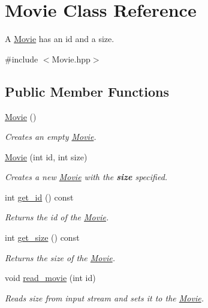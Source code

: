 \hypertarget{class_movie}{\section{Movie Class Reference}
\label{de/d14/class_movie}
}


A \hyperlink{class_movie}{Movie} has an id and a size.  




{\ttfamily \#include $<$Movie.\-hpp$>$}

\subsection*{Public Member Functions}
\begin{DoxyCompactItemize}
\item 
\hyperlink{class_movie_a62d82e9e61d6349ae66a73d0af6667ac}{Movie} ()
\begin{DoxyCompactList}\small\item\em Creates an empty \hyperlink{class_movie}{Movie}. \end{DoxyCompactList}\item 
\hyperlink{class_movie_a914e028c5499c5945f3acfb785977802}{Movie} (int id, int size)
\begin{DoxyCompactList}\small\item\em Creates a new \hyperlink{class_movie}{Movie} with the {\bfseries size} specified. \end{DoxyCompactList}\item 
int \hyperlink{class_movie_a363e66932a5d16dc86c58f57a8b3e72a}{get\-\_\-id} () const 
\begin{DoxyCompactList}\small\item\em Returns the id of the \hyperlink{class_movie}{Movie}. \end{DoxyCompactList}\item 
int \hyperlink{class_movie_a92d213d1f005f758cd298dff2a0355f8}{get\-\_\-size} () const 
\begin{DoxyCompactList}\small\item\em Returns the size of the \hyperlink{class_movie}{Movie}. \end{DoxyCompactList}\item 
void \hyperlink{class_movie_aed2f694a5ac3a776e3ba8d297dee6e3a}{read\-\_\-movie} (int id)
\begin{DoxyCompactList}\small\item\em Reads size from input stream and sets it to the \hyperlink{class_movie}{Movie}. \end{DoxyCompactList}\end{DoxyCompactItemize}



